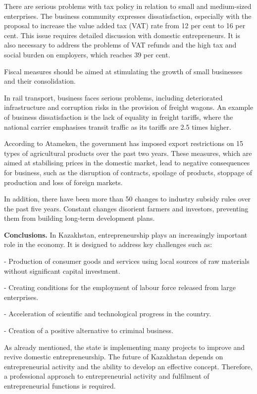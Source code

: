 There are serious problems with tax policy in relation to small and
medium-sized enterprises. The business community expresses
dissatisfaction, especially with the proposal to increase the value
added tax (VAT) rate from 12 per cent to 16 per cent. This issue
requires detailed discussion with domestic entrepreneurs. It is also
necessary to address the problems of VAT refunds and the high tax and
social burden on employers, which reaches 39 per cent.

Fiscal measures should be aimed at stimulating the growth of small
businesses and their consolidation.

In rail transport, business faces serious problems, including
deteriorated infrastructure and corruption risks in the provision of
freight wagons. An example of business dissatisfaction is the lack of
equality in freight tariffs, where the national carrier emphasises
transit traffic as its tariffs are 2.5 times higher.

According to Atameken, the government has imposed export restrictions on
15 types of agricultural products over the past two years. These
measures, which are aimed at stabilising prices in the domestic market,
lead to negative consequences for business, such as the disruption of
contracts, spoilage of products, stoppage of production and loss of
foreign markets.

In addition, there have been more than 50 changes to industry subsidy
rules over the past five years. Constant changes disorient farmers and
investors, preventing them from building long-term development plans.

{\bfseries Conclusions.} In Kazakhstan, entrepreneurship plays an
increasingly important role in the economy. It is designed to address
key challenges such as:

- Production of consumer goods and services using local sources of raw
materials without significant capital investment.

- Creating conditions for the employment of labour force released from
large enterprises.

- Acceleration of scientific and technological progress in the country.

- Creation of a positive alternative to criminal business.

As already mentioned, the state is implementing many projects to improve
and revive domestic entrepreneurship. The future of Kazakhstan depends
on entrepreneurial activity and the ability to develop an effective
concept. Therefore, a professional approach to entrepreneurial activity
and fulfilment of entrepreneurial functions is required.

